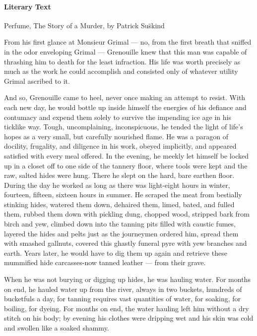 \documentclass[a4paper,12pt]{article}
\begin{document}
\paragraph{Literary Text}
Perfume, The Story of a Murder, by Patrick Su\"skind

\begin{linenumbers}
    From his first glance at Monsieur Grimal --- no, from the first breath that sniffed in the odor
enveloping Grimal --- Grenouille knew that this man was capable of thrashing him to death for the least
infraction. His life was worth precisely as much as the work he could accomplish and consisted only of
whatever utility Grimal ascribed to it.

And so, Grenouille came to heel, never once making an attempt
to  resist.  With  each  new  day,  he  would  bottle  up  inside  himself  the  energies  of  his  defiance  and
contumacy  and  expend  them  solely  to  survive  the  impending  ice  age  in  his  ticklike  way.  Tough,
uncomplaining,  inconspicuous,  he  tended  the  light  of  life’s  hopes  as  a  very  small,  but  carefully
nourished flame. He was a paragon of docility, frugality, and diligence in his work, obeyed implicitly,
and appeared satisfied with every meal offered. In the evening, he meekly let himself be locked up in a
closet off to one side of the tannery floor, where tools were kept and the raw, salted hides were hung.
There  he  slept  on  the  hard,  bare  earthen  floor.  During  the  day  he  worked  as  long  as  there  was
light-eight  hours  in  winter,  fourteen,  fifteen,  sixteen  hours  in  summer.  He  scraped  the  meat  from
bestially  stinking  hides,  watered  them  down,  dehaired  them,  limed,  bated, and fulled  them,  rubbed
them down with pickling dung, chopped wood, stripped bark from birch and yew, climbed down into
the tanning pits filled with caustic fumes, layered the hides and pelts just as the journeymen ordered
him,  spread  them  with  smashed  gallnuts,  covered  this  ghastly  funeral  pyre  with  yew  branches  and
earth.  Years  later,  he  would  have  to  dig  them  up  again  and  retrieve  these  mummified  hide
carcasses-now tanned leather --- from their grave.

When he was not burying or digging up hides, he was hauling water. For months on end, he
hauled  water  up  from  the  river,  always  in  two  buckets,  hundreds  of  bucketfuls  a  day,  for  tanning
requires vast quantities of water, for soaking, for boiling, for dyeing. For months on end, the water
hauling left him without a dry stitch on his body; by evening his clothes were dripping wet and his skin
was cold and swollen like a soaked shammy.
\end{linenumbers}
\end{document}
